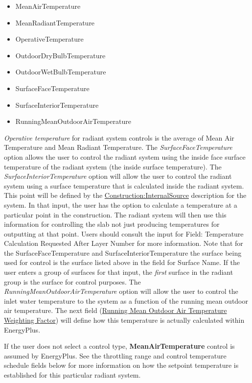 \begin{itemize}
\item
  MeanAirTemperature
\item
  MeanRadiantTemperature
\item
  OperativeTemperature
\item
  OutdoorDryBulbTemperature
\item
  OutdoorWetBulbTemperature
\item
  SurfaceFaceTemperature
\item
  SurfaceInteriorTemperature
\item
  RunningMeanOutdoorAirTemperature
\end{itemize}

\emph{Operative temperature} for radiant system controls is the average of Mean Air Temperature and Mean Radiant Temperature.  The \emph{SurfaceFaceTemperature} option allows the user to control the radiant system using the inside face surface temperature of the radiant system (the inside surface temperature).  The \emph{SurfaceInteriorTemperature} option will allow the user to control the radiant system using a surface temperature that is calculated inside the radiant system.  This point will be defined by the  \hyperref[constructioninternalsource]{Construction:InternalSource} description for the system.  In that input, the user has the option to calculate a temperature at a particular point in the construction.  The radiant system will then use this information for controlling the slab not just producing temperatures for outputting at that point.  Users should consult the input for Field: Temperature Calculation Requested After Layer Number for more information.  Note that for the SurfaceFaceTemperature and SurfaceInteriorTemperature the surface being used for control is the surface listed above in the field for Surface Name.  If the user enters a group of surfaces for that input, the \emph{first} surface in the radiant group is the surface for control purposes.  The \emph{RunningMeanOutdoorAirTemperature} option will allow the user to control the inlet water temperature to the system as a function of the running mean outdoor air temperature.  The next field (\hyperref[field-running-mean-outdoor-air-temperature-weighting-factor]{Running Mean Outdoor Air Temperature Weighting Factor}) will define how this temperature is actually calculated within EnergyPlus.

If the user does not select a control type, \textbf{MeanAirTemperature} control is assumed by EnergyPlus. See the throttling range and control temperature schedule fields below for more information on how the setpoint temperature is established for this particular radiant system.

